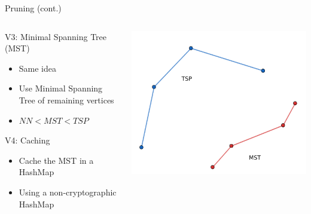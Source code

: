 \begin{frame}{Pruning (cont.)}
  \vspace*{-0.5cm}
  \begin{columns}
    \begin{column}{0.5\textwidth}
      \begin{block}{V3: Minimal Spanning Tree (MST)}
        \begin{itemize}
          \item Same idea
          \item Use Minimal Spanning Tree of remaining vertices
          \item $NN < MST < TSP$
        \end{itemize}
      \end{block}
      \pause
      \begin{block}{V4: Caching}
        \begin{itemize}
          \item Cache the MST in a HashMap
          \item Using a non-cryptographic HashMap
        \end{itemize}
      \end{block}
    \end{column}
    \pause
    \begin{column}{0.5\textwidth}
      \includegraphics[width=\textwidth]{./assets/mst.png}
    \end{column}
  \end{columns}
\end{frame}

